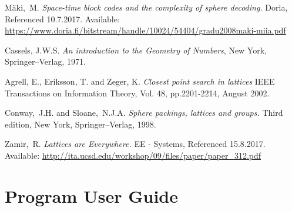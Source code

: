 \documentclass[english,12pt,a4paper,pdftex,sci,utf8]{aaltothesis}
\begin{document}
{}
\begin{thebibliography}{99}

 Mäki,\ M. \textit{Space-time block codes and the complexity of sphere decoding.} Doria, Referenced 10.7.2017. Available:
  \url{https://www.doria.fi/bitstream/handle/10024/54404/gradu2008maki-miia.pdf}
   
 Cassels, J.W.S. \textit{An introduction to the Geometry of Numbers}, New York, Springer--Verlag, 1971.

 Agrell, E., Eriksson, T. and Zeger, K. \textit{Closest point search in lattices} IEEE Transactions on Information Theory, Vol. 48, pp.2201-2214,
August 2002.

 Conway,\ J.H. and Sloane,\ N.J.A. \textit{Sphere packings, lattices and groups.} Third edition, New York, Springer--Verlag, 1998.

 Zamir,\ R. \textit{Lattices are Everywhere.} EE - Systems, Referenced 15.8.2017. Available: \url{http://ita.ucsd.edu/workshop/09/files/paper/paper_312.pdf}


\end{thebibliography}

\clearpage

\thesisappendix

\section{Program User Guide}

\end{document}
